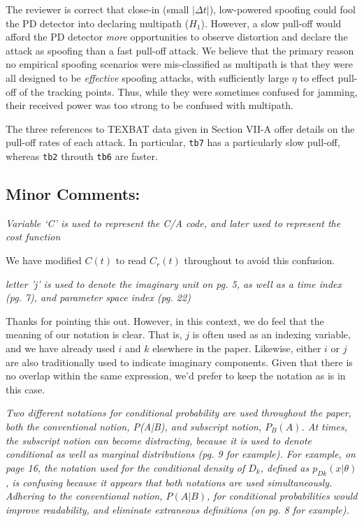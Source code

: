\documentclass[12pt]{report}
\begin{document}
  
   The reviewer is correct that close-in (small $|\Delta t|$),
    low-powered spoofing could fool the PD detector into declaring multipath
    ($H_1$).  However, a slow pull-off would afford the PD detector
    \emph{more} opportunities to observe distortion and declare the attack as
    spoofing than a fast pull-off attack.  We believe that the primary reason
    no empirical spoofing scenarios were mis-classified as multipath is that
    they were all designed to be \emph{effective} spoofing attacks, with
    sufficiently large $\eta$ to effect pull-off of the tracking points.
    Thus, while they were sometimes confused for jamming, their received power
    was too strong to be confused with multipath.

    The three references to TEXBAT data given in Section VII-A offer details
    on the pull-off rates of each attack.  In particular, {\tt tb7} has a
    particularly slow pull-off, whereas {\tt tb2} throuth {\tt tb6} are faster.
  
  


\subsection*{Minor Comments:}

{\textit{Variable `C' is used to represent the C/A code, and later used
      to represent the cost function}}
  
  {{We have modified $C(t)$ to read $C_r(t)$ throughout to avoid this confusion.}}
  

{\textit{letter 'j' is used to denote the imaginary unit on pg. 5,
      as well as a time index (pg. 7), and parameter space index
      (pg. 22) }}

  
  {{ Thanks for pointing this out. However, in this context, we do feel that
      the meaning of our notation is clear. That is, $j$ is often used as an
      indexing variable, and we have already used $i$ and $k$ elsewhere in the
      paper. Likewise, either $i$ or $j$ are also traditionally used to
      indicate imaginary components. Given that there is no overlap within the
      same expression, we'd prefer to keep the notation as is in this case.}}
  

{\textit{ Two different notations for conditional probability are used
      throughout the paper, both the conventional notion, P(A|B), and
      subscript notion, $P_B(A)$. At times, the subscript notion can become
      distracting, because it is used to denote conditional as well as
      marginal distributions (pg. 9 for example). For example, on page 16, the
      notation used for the conditional density of $D_k$, defined as
      $p_{Dk}(x | \theta)$, is confusing because it appears that both
      notations are used simultaneously. Adhering to the conventional notion,
      $P(A|B)$, for conditional probabilities would improve readability, and
      eliminate extraneous definitions (on pg. 8 for example). }}
\end{document}
